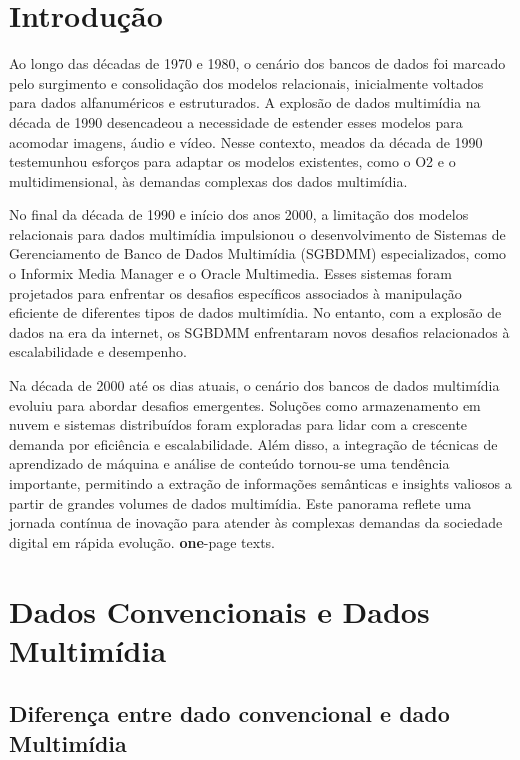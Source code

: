 \documentclass[12pt]{article}
\begin{document}
	\section{Introdução}
	
	Ao longo das décadas de 1970 e 1980, o cenário dos bancos de dados foi marcado pelo surgimento e consolidação dos modelos relacionais, inicialmente voltados para dados alfanuméricos e estruturados. A explosão de dados multimídia na década de 1990 desencadeou a necessidade de estender esses modelos para acomodar imagens, áudio e vídeo. Nesse contexto, meados da década de 1990 testemunhou esforços para adaptar os modelos existentes, como o O2 e o multidimensional, às demandas complexas dos dados multimídia.
	
	No final da década de 1990 e início dos anos 2000, a limitação dos modelos relacionais para dados multimídia impulsionou o desenvolvimento de Sistemas de Gerenciamento de Banco de Dados Multimídia (SGBDMM) especializados, como o Informix Media Manager e o Oracle Multimedia. Esses sistemas foram projetados para enfrentar os desafios específicos associados à manipulação eficiente de diferentes tipos de dados multimídia. No entanto, com a explosão de dados na era da internet, os SGBDMM enfrentaram novos desafios relacionados à escalabilidade e desempenho.
	
	Na década de 2000 até os dias atuais, o cenário dos bancos de dados multimídia evoluiu para abordar desafios emergentes. Soluções como armazenamento em nuvem e sistemas distribuídos foram exploradas para lidar com a crescente demanda por eficiência e escalabilidade. Além disso, a integração de técnicas de aprendizado de máquina e análise de conteúdo tornou-se uma tendência importante, permitindo a extração de informações semânticas e insights valiosos a partir de grandes volumes de dados multimídia. Este panorama reflete uma jornada contínua de inovação para atender às complexas demandas da sociedade digital em rápida evolução. \textbf{one}-page texts.
	
	\section{Dados Convencionais e Dados Multimídia} \label{sec:firstpage}
	
	\vspace{0.5 cm} \subsection{Diferença entre dado convencional e dado Multimídia}
	
\end{document}

